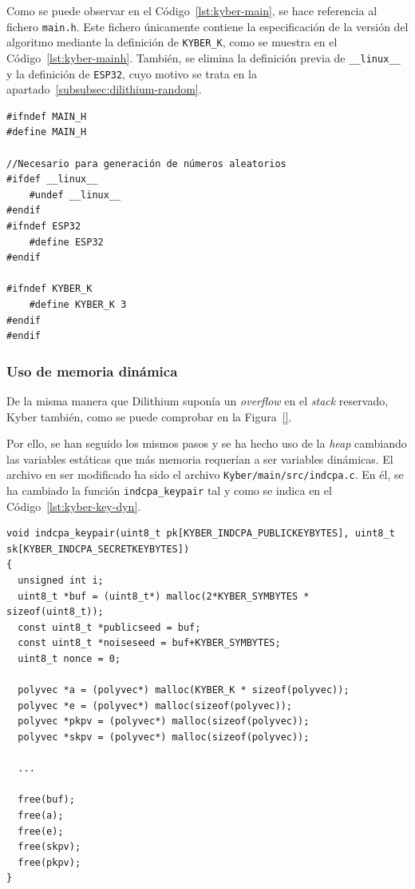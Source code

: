 Como se puede observar en el Código~\ref{lst:kyber-main}, se hace referencia al fichero \texttt{main.h}.
Este fichero únicamente contiene la especificación de la versión del algoritmo mediante la definición de \texttt{KYBER\_K}, como se muestra en el Código~\ref{lst:kyber-mainh}.
También, se elimina la definición previa de \texttt{\_\_linux\_\_} y la definición de \texttt{ESP32}, cuyo motivo se trata en la apartado~\ref{subsubsec:dilithium-random}.

\begin{lstlisting}[label={lst:kyber-mainh},style=Cnice,firstnumber=1,caption={Archivo \texttt{Kyber/main/include/main.h}.}]
#ifndef MAIN_H
#define MAIN_H

//Necesario para generación de números aleatorios
#ifdef __linux__
    #undef __linux__
#endif
#ifndef ESP32
    #define ESP32
#endif

#ifndef KYBER_K
    #define KYBER_K 3
#endif
#endif
\end{lstlisting}


\subsubsection{Uso de memoria dinámica}\label{subsubsec:kyber-dynamic}

De la misma manera que Dilithium suponía un \textit{overflow} en el \textit{stack} reservado, Kyber también, como se puede comprobar en la Figura~\ref{}.


Por ello, se han seguido los mismos pasos y se ha hecho uso de la \textit{heap} cambiando las variables estáticas que más memoria requerían a ser variables dinámicas.
El archivo en ser modificado ha sido el archivo \texttt{Kyber/main/src/indcpa.c}.
En él, se ha cambiado la función \texttt{indcpa\_keypair} tal y como se indica en el Código~\ref{lst:kyber-key-dyn}.

\begin{lstlisting}[label={lst:kyber-key-dyn},style=Cnice,firstnumber=1,caption={Modificación de la función \texttt{indcpa\_keypair} en el archivo \texttt{Kyber/main/src/indcpa.c}.}]
void indcpa_keypair(uint8_t pk[KYBER_INDCPA_PUBLICKEYBYTES], uint8_t sk[KYBER_INDCPA_SECRETKEYBYTES])
{
  unsigned int i;
  uint8_t *buf = (uint8_t*) malloc(2*KYBER_SYMBYTES * sizeof(uint8_t));
  const uint8_t *publicseed = buf;
  const uint8_t *noiseseed = buf+KYBER_SYMBYTES;
  uint8_t nonce = 0;

  polyvec *a = (polyvec*) malloc(KYBER_K * sizeof(polyvec));
  polyvec *e = (polyvec*) malloc(sizeof(polyvec));
  polyvec *pkpv = (polyvec*) malloc(sizeof(polyvec));
  polyvec *skpv = (polyvec*) malloc(sizeof(polyvec));

  ...

  free(buf);
  free(a);
  free(e);
  free(skpv);
  free(pkpv);
}
\end{lstlisting}

